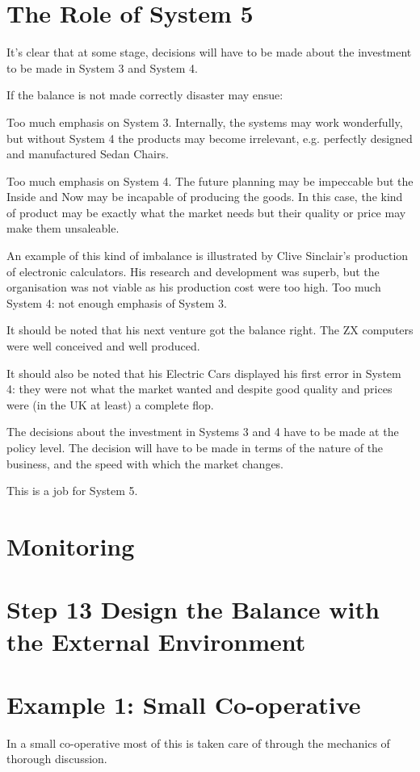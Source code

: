 \section*{The Role of System 5}
It's clear that at some stage, decisions will have to be made about the investment to be made in System 3 and System 4.

If the balance is not made correctly disaster may ensue:

Too much emphasis on System 3. Internally, the systems may work wonderfully, but without System 4 the products may become irrelevant, e.g. perfectly designed and manufactured Sedan Chairs.

Too much emphasis on System 4. The future planning may be impeccable but the Inside and Now may be incapable of producing the goods. In this case, the kind of product may be exactly what the market needs but their quality or price may make them unsaleable.

An example of this kind of imbalance is illustrated by Clive Sinclair's production of electronic calculators. His research and development was superb, but the organisation was not viable as his production cost were too high. Too much System 4: not enough emphasis of System 3.

It should be noted that his next venture got the balance right. The ZX computers were well conceived and well produced.

It should also be noted that his Electric Cars displayed his first error in System 4: they were not what the market wanted and despite good quality and prices were (in the UK at least) a complete flop.

The decisions about the investment in Systems 3 and 4 have to be made at the policy level. The decision will have to be made in terms of the nature of the business, and the speed with which the market changes.

This is a job for System 5.

\section*{Monitoring}

\section*{Step 13 Design the Balance with the External Environment}

\section*{Example 1: Small Co-operative}
In a small co-operative most of this is taken care of through the mechanics of thorough discussion.

